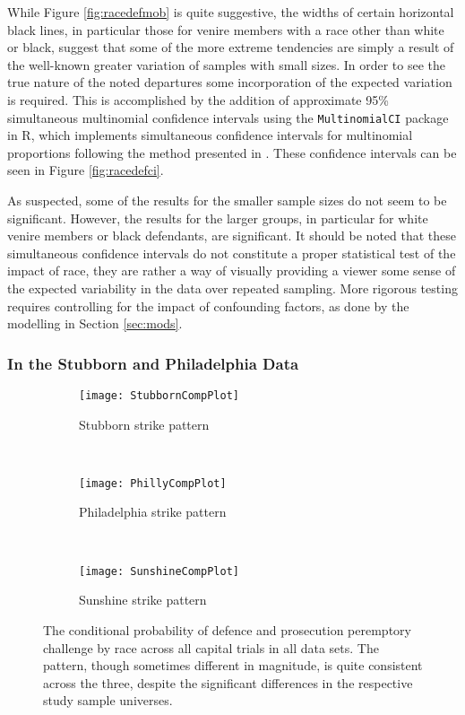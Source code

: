 While Figure \ref{fig:racedefmob} is quite suggestive, the widths of certain horizontal black lines, in particular those for
venire members with a race other than white or black, suggest that some of the more extreme tendencies are simply a result
of the well-known greater variation of samples with small sizes. In order to see the true nature of the noted departures some
incorporation of the expected variation is required. This is accomplished by the addition of
approximate 95\% simultaneous multinomial confidence intervals using the \texttt{MultinomialCI} package in R, which implements
simultaneous confidence intervals for multinomial proportions following the method presented in \cite{sison1995}. These confidence
intervals can be seen in Figure \ref{fig:racedefci}.

As suspected, some of the results for the smaller sample sizes do not seem to be significant. However, the results for the larger groups,
in particular for white venire members or black defendants, are significant. It should be noted that these simultaneous
confidence intervals do not constitute a proper statistical test of the impact of race, they are rather a way of visually
providing a viewer some sense of the expected variability in the data over repeated sampling. More rigorous testing requires
controlling for the impact of confounding factors, as done by the modelling in Section \ref{sec:mods}.

\subsubsection{In the Stubborn and Philadelphia Data}

\begin{figure}[h!]
  \centering
  \begin{subfigure}{0.32\textwidth}
    \texttt{[image: StubbornCompPlot]}
    \caption{\footnotesize Stubborn strike pattern}
    \label{fig:stubcomp}
  \end{subfigure}
  ~
  \begin{subfigure}{0.32\textwidth}
    \texttt{[image: PhillyCompPlot]}
    \caption{\footnotesize Philadelphia strike pattern}
    \label{fig:philcomp}
  \end{subfigure}
  ~
  \begin{subfigure}{0.32\textwidth}
    \texttt{[image: SunshineCompPlot]}
    \caption{\footnotesize Sunshine strike pattern}
    \label{fig:suncomp}
  \end{subfigure}
  \caption[Strikes by Racial Combination (All Capital Trial Data)]
  {\footnotesize The conditional probability of defence and prosecution peremptory challenge by race across all
    capital trials in all data sets. The pattern, though sometimes different in magnitude, is quite consistent across the three,
    despite the significant differences in the respective study sample universes.}
  \label{fig:racedefalldata}
\end{figure}

